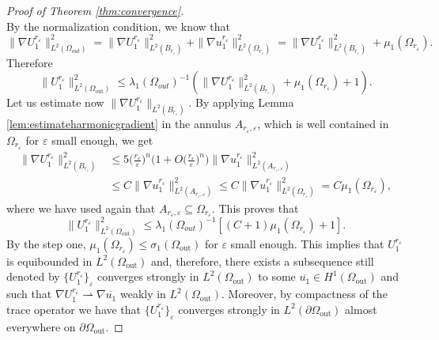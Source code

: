 \documentclass[12pt,reqno]{amsart}
\numberwithin{equation}{section}
\numberwithin{theorem}{section}
\numberwithin{equation}{section}
\numberwithin{theorem}{section}
\begin{document}
\begin{proof}[Proof of Theorem \ref{thm:convergence}]
\begin{equation*}
\end{equation*}
By the normalization condition, we know that
\begin{equation*}
    \|\nabla U_1^{r_\varepsilon}\|_{L^2(\Omega_{out})}^2= \|\nabla U_1^{r_\varepsilon}\|_{L^2(B_{r_\varepsilon})}^2+\|\nabla u_1^{r_\varepsilon}\|_{L^2(\Omega_{r_\varepsilon})}^2=\|\nabla U_1^{r_\varepsilon}\|_{L^2(B_{r_\varepsilon})}^2+\mu_1(\Omega_{r_\varepsilon}).
\end{equation*}
Therefore
\begin{equation*}
     \|U_1^{r_\varepsilon}\|^2_{L^2(\Omega_{\mathrm{out}})}\le \lambda_1(\Omega_{out})^{-1}(\|\nabla U_1^{r_\varepsilon}\|_{L^2(B_{r_\varepsilon})}^2+\mu_1(\Omega_{r_\varepsilon})+1).
\end{equation*}
Let us estimate now $\|\nabla U_1^{r_\varepsilon}\|_{L^2(B_{r_\varepsilon})}$. By applying Lemma \ref{lem:estimateharmonicgradient} in the annulus $A_{r_\varepsilon,\varepsilon}$, which is well contained in $\Omega_{r_\varepsilon}$ for $\varepsilon$ small enough, we get
\begin{equation*}
\begin{split}
    \| \nabla U_1^{r_\varepsilon}\|^2_{L^2(B_{r_\varepsilon})}&\le 5\bigg(\frac{r_\varepsilon}{\varepsilon}\bigg)^n\bigg(1+O\bigg(\frac{r_\varepsilon}{\varepsilon}\bigg)^n\bigg)\|\nabla u_1^{r_\varepsilon}\|^2_{L^2(A_{r_\varepsilon,\varepsilon})}  \\
    & \le C\|\nabla u_1^{r_\varepsilon}\|^2_{L^2(A_{r_\varepsilon,\varepsilon})}\le C \|\nabla u_1^{r_\varepsilon}\|^2_{L^2(\Omega_{r_\varepsilon})}= C\mu_1(\Omega_{r_\varepsilon}),
\end{split}
\end{equation*}
where we have used again that $A_{r_\varepsilon,\varepsilon}\subseteq \Omega_{r_\varepsilon}$. This proves that
\begin{equation*}
      \|U_1^{r_\varepsilon}\|^2_{L^2(\Omega_\mathrm{out})}\le \lambda_1(\Omega_{out})^{-1}[(C+1)\mu_1(\Omega_{r_\varepsilon})+1].
\end{equation*}
By the step one, $\mu_1(\Omega_{r_\varepsilon})\le \sigma_1(\Omega_{\mathrm{out}})$ for $\varepsilon$ small enough. This implies that $U_1^{r_\varepsilon}$ is equibounded in $L^2(\Omega_{\mathrm{out}})$ and, therefore, there exists a subsequence still denoted by  $\{U_1^{r_\varepsilon}\}_\varepsilon$ converges strongly in $L^2(\Omega_{\mathrm{out}})$ to some $\overline{u_1} \in H^1(\Omega_{\mathrm{out}})$ and such that $\nabla U_1^{r_\varepsilon} \rightharpoonup \nabla \overline{u_1}$ weakly in $L^2(\Omega_{\mathrm{out}}).$ Moreover, by compactness of the trace operator we have that   $\{U_1^{r_\varepsilon}\}_\varepsilon$   converges strongly in $L^2(\partial\Omega_{\mathrm{out}})$ almost everywhere on  $\partial\Omega_{\mathrm{out}}.$


\end{proof}
\end{document}
